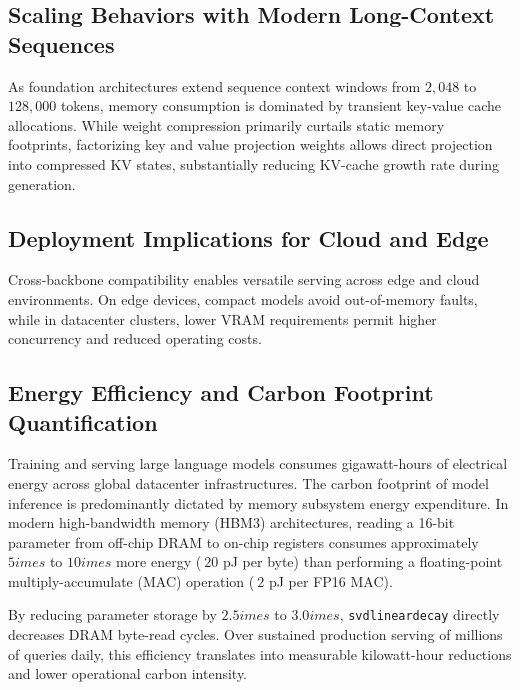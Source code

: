 \subsection{Scaling Behaviors with Modern Long-Context Sequences}
As foundation architectures extend sequence context windows from $2{,}048$ to $128{,}000$ tokens, memory consumption is dominated by transient key-value cache allocations. While weight compression primarily curtails static memory footprints, factorizing key and value projection weights allows direct projection into compressed KV states, substantially reducing KV-cache growth rate during generation.

\subsection{Deployment Implications for Cloud and Edge}
Cross-backbone compatibility enables versatile serving across edge and cloud environments. On edge devices, compact models avoid out-of-memory faults, while in datacenter clusters, lower VRAM requirements permit higher concurrency and reduced operating costs.

\subsection{Energy Efficiency and Carbon Footprint Quantification}
Training and serving large language models consumes gigawatt-hours of electrical energy across global datacenter infrastructures. The carbon footprint of model inference is predominantly dictated by memory subsystem energy expenditure. In modern high-bandwidth memory (HBM3) architectures, reading a 16-bit parameter from off-chip DRAM to on-chip registers consumes approximately $5	imes$ to $10	imes$ more energy ($~20$ pJ per byte) than performing a floating-point multiply-accumulate (MAC) operation ($~2$ pJ per FP16 MAC).

By reducing parameter storage by $2.5	imes$ to $3.0	imes$, \texttt{svdlineardecay} directly decreases DRAM byte-read cycles. Over sustained production serving of millions of queries daily, this efficiency translates into measurable kilowatt-hour reductions and lower operational carbon intensity.
